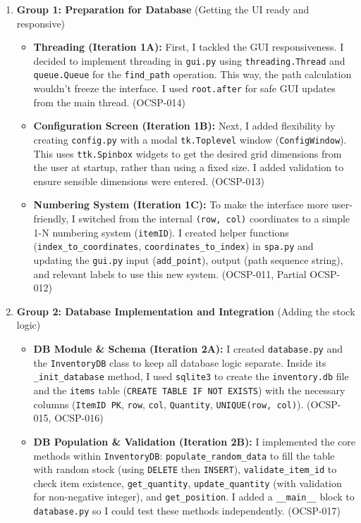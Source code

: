 \begin{enumerate}
	\item \textbf{Group 1: Preparation for Database} (Getting the UI ready and responsive)
	\begin{itemize}
		\item \textbf{Threading (Iteration 1A):} First, I tackled the GUI responsiveness. I decided to implement threading in \verb|gui.py| using \verb|threading.Thread| and \verb|queue.Queue| for the \verb|find_path| operation. This way, the path calculation wouldn't freeze the interface. I used \verb|root.after| for safe GUI updates from the main thread. (OCSP-014)
		\item \textbf{Configuration Screen (Iteration 1B):} Next, I added flexibility by creating \verb|config.py| with a modal \verb|tk.Toplevel| window (\verb|ConfigWindow|). This uses \verb|ttk.Spinbox| widgets to get the desired grid dimensions from the user at startup, rather than using a fixed size. I added validation to ensure sensible dimensions were entered. (OCSP-013)
		\item \textbf{Numbering System (Iteration 1C):} To make the interface more user-friendly, I switched from the internal \verb|(row, col)| coordinates to a simple 1-N numbering system (\verb|itemID|). I created helper functions (\verb|index_to_coordinates|, \verb|coordinates_to_index|) in \verb|spa.py| and updating the \verb|gui.py| input (\verb|add_point|), output (path sequence string), and relevant labels to use this new system. (OCSP-011, Partial OCSP-012)
	\end{itemize}
	\item \textbf{Group 2: Database Implementation and Integration} (Adding the stock logic)
	\begin{itemize}
		\item \textbf{DB Module \& Schema (Iteration 2A):} I created \verb|database.py| and the \verb|InventoryDB| class to keep all database logic separate. Inside its \verb|_init_database| method, I used \verb|sqlite3| to create the \verb|inventory.db| file and the \verb|items| table (\verb|CREATE TABLE IF NOT EXISTS|) with the necessary columns (\verb|ItemID PK|, \verb|row|, \verb|col|, \verb|Quantity|, \verb|UNIQUE(row, col)|). (OCSP-015, OCSP-016)
		\item \textbf{DB Population \& Validation (Iteration 2B):} I implemented the core methods within \verb|InventoryDB|: \verb|populate_random_data| to fill the table with random stock (using \verb|DELETE| then \verb|INSERT|), \verb|validate_item_id| to check item existence, \verb|get_quantity|, \verb|update_quantity| (with validation for non-negative integer), and \verb|get_position|. I added a \verb|__main__| block to \verb|database.py| so I could test these methods independently. (OCSP-017)

\end{itemize}
\end{enumerate}
